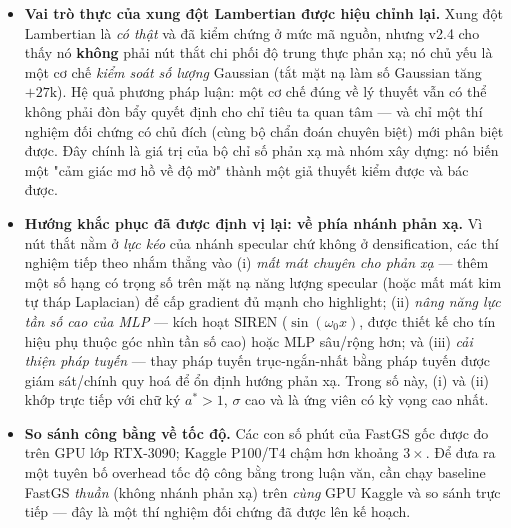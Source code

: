 \begin{itemize}
\begin{enumerate}
            tác động lên \textit{phiếu densification}, không lên \textit{gradient
            ảnh} cấp cho MLP.
            \item \textbf{Pháp tuyến giả nhiễu.} \texttt{ASGRender} tính hướng phản
            xạ \texttt{reflect\_dir} từ pháp tuyến lấy theo \textit{trục ngắn nhất}
            của Gaussian (\texttt{get\_minimum\_axis}) — một pháp tuyến \textit{hình
            học}, không được giám sát. Với các Gaussian gần đẳng hướng (ba trục co
            giãn xấp xỉ nhau), trục ngắn nhất gần như là nhiễu; hướng phản xạ vì thế
            dao động giữa các Gaussian lân cận, làm thuỳ ASG chĩa sai → highlight bị
            đặt lệch (NCC thấp) và bị "bôi" nhoè khi tổng hợp qua nhiều Gaussian
            ($\sigma$ cao). Đây là nguồn gốc độc lập của sai số cấu trúc
            ($\text{structural}\% \approx 98$, gần như không thể sửa chỉ bằng hệ số
            độ sáng).
        \end{enumerate}
        \item \textbf{Vai trò thực của xung đột Lambertian được hiệu chỉnh lại.} Xung
        đột Lambertian là \textit{có thật} và đã kiểm chứng ở mức mã nguồn, nhưng
        v2.4 cho thấy nó \textbf{không} phải nút thắt chi phối độ trung thực phản xạ;
        nó chủ yếu là một cơ chế \textit{kiểm soát số lượng} Gaussian (tắt mặt nạ làm
        số Gaussian tăng $+27\text{k}$). Hệ quả phương pháp luận: một cơ chế đúng về
        lý thuyết vẫn có thể không phải đòn bẩy quyết định cho chỉ tiêu ta quan tâm —
        và chỉ một thí nghiệm đối chứng có chủ đích (cùng bộ chẩn đoán chuyên biệt)
        mới phân biệt được. Đây chính là giá trị của bộ chỉ số phản xạ mà nhóm xây
        dựng: nó biến một "cảm giác mơ hồ về độ mờ" thành một giả thuyết kiểm được và
        bác được.
        \item \textbf{Hướng khắc phục đã được định vị lại: về phía nhánh phản xạ.}
        Vì nút thắt nằm ở \textit{lực kéo} của nhánh specular chứ không ở
        densification, các thí nghiệm tiếp theo nhắm thẳng vào (i) \textit{mất mát
        chuyên cho phản xạ} — thêm một số hạng có trọng số trên mặt nạ năng lượng
        specular (hoặc mất mát kim tự tháp Laplacian) để cấp gradient đủ mạnh cho
        highlight; (ii) \textit{nâng năng lực tần số cao của MLP} — kích hoạt SIREN
        ($\sin(\omega_0 x)$, được thiết kế cho tín hiệu phụ thuộc góc nhìn tần số
        cao) hoặc MLP sâu/rộng hơn; và (iii) \textit{cải thiện pháp tuyến} — thay
        pháp tuyến trục-ngắn-nhất bằng pháp tuyến được giám sát/chính quy hoá để ổn
        định hướng phản xạ. Trong số này, (i) và (ii) khớp trực tiếp với chữ ký
        $a^*>1$, $\sigma$ cao và là ứng viên có kỳ vọng cao nhất.
        \item \textbf{So sánh công bằng về tốc độ.} Các con số phút của FastGS gốc
        được đo trên GPU lớp RTX-3090; Kaggle P100/T4 chậm hơn khoảng $3\times$. Để
        đưa ra một tuyên bố overhead tốc độ công bằng trong luận văn, cần chạy
        baseline FastGS \textit{thuần} (không nhánh phản xạ) trên \textit{cùng} GPU
        Kaggle và so sánh trực tiếp — đây là một thí nghiệm đối chứng đã được lên kế
        hoạch.
    \end{itemize}

